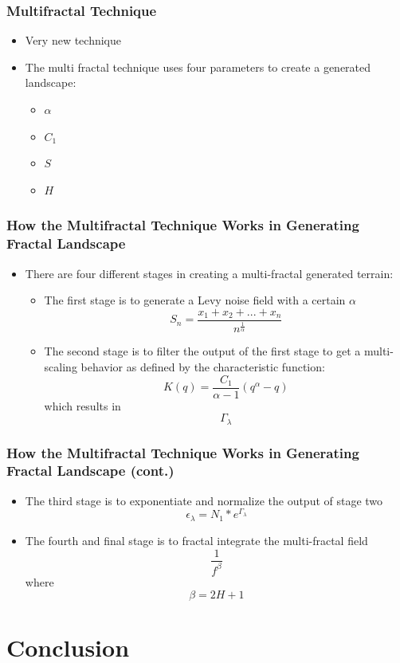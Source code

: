 \documentclass{beamer}
\begin{document}
\begin{frame}
 \frametitle{Multifractal Technique}
\begin{itemize}
\item Very new technique 
\item The multi fractal technique uses four parameters to create a generated landscape: 
\begin{itemize}
\item $\alpha$ 
\item $C_{1}$
\item $S$
\item $H$
\end{itemize} 
\end{itemize}
\end{frame}


\begin{frame}
\frametitle{How the Multifractal Technique Works in Generating Fractal Landscape}
\begin{itemize}
\item There are four different stages in creating a multi-fractal generated terrain:
\begin{itemize}
\item The first stage is to generate a Levy noise field with a certain $\alpha$
$${S_{n}} = \frac{{x_{1}} + {x_{2}} + ... + {x_{n}}}{n^{\frac{1}{\alpha}}}$$
\item The second stage is to filter the output of the first stage to get a multi-scaling behavior as defined by the characteristic function: 
$$K(q) = \frac{C_{1}}{\alpha - 1}\left(q^{\alpha} - q\right)$$ which results in $${\Gamma_{\lambda}}$$
\end{itemize}
\end{itemize}
\end{frame}

\begin{frame}
\frametitle{How the Multifractal Technique Works in Generating Fractal Landscape (cont.)}
\begin{itemize}
\item The third stage is to exponentiate and normalize the output of stage two
$${\epsilon_{\lambda}} = {N_{1}} * e^{{\Gamma_{\lambda}}}$$
\item The fourth and final stage is to fractal integrate the multi-fractal field
$$\frac{1}{f^{\beta}}$$ where $$\beta = 2H + 1$$
\end{itemize}
\end{frame}

\section{Conclusion}
\end{document}
